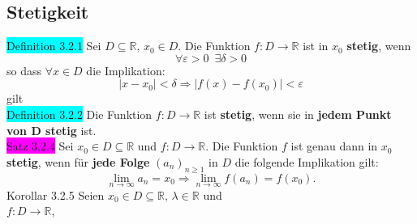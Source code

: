 \documentclass[landscape, 10pt]{article}
\newcommand{\R}{\mathbb{R}}
\begin{document}
\begin{multicols}{3}
       \subsection{Stetigkeit}
              \colorbox{cyan}{Definition 3.2.1} 
                     Sei $D\subseteq\R,\,x_0\in D$. 
                     Die Funktion \textcolor{NavyBlue}{$f:D\longrightarrow\R$} 
                     ist in $x_0$ \textbf{stetig}, 
                     wenn 
                     \begin{equation*}
                            \forall\varepsilon>0
                            \enspace\exists\delta>0
                     \end{equation*}
                     so dass 
                     \textcolor{NavyBlue}{$\forall x\in D$} 
                     die Implikation:
                     \begin{equation*}
                            |x-x_0|<\delta\Rightarrow|f(x)-f(x_0)|<\varepsilon
                     \end{equation*}
                     gilt\\
              \colorbox{cyan}{Definition 3.2.2} 
                     Die Funktion \textcolor{NavyBlue}{$f:D\longrightarrow\R$}
                     ist \textbf{stetig}, wenn sie in 
                     \textbf{jedem Punkt von D stetig} ist.\\
              \colorbox{magenta}{Satz 3.2.4} Sei 
                     \textcolor{NavyBlue}{$x_0\in D\subseteq\R$} und 
                     \textcolor{NavyBlue}{$f:D\longrightarrow\R$}. 
                     Die Funktion \textcolor{NavyBlue}{$f$} ist genau 
                     dann in \textcolor{NavyBlue}{$x_0$} 
                     \textbf{stetig}, wenn für 
                     \textbf{jede Folge} 
                     \textcolor{NavyBlue}{$(a_n)_{n\geqslant1}$} 
                     in $D$ die folgende Implikation gilt: 
                     \begin{equation*}
                            \lim\limits_{n\to\infty}a_n=x_0\Longrightarrow
                            \lim\limits_{n\to\infty}f(a_n)=f(x_0). 
                     \end{equation*}
              \colorbox{BurntOrange}{Korollar 3.2.5} Seien 
                     \textcolor{NavyBlue}{
                     $x_0\in D\subseteq\R,\,\lambda\in\R$} und \\
                     \textcolor{NavyBlue}{
                     $f:D\longrightarrow\R$},\,
                     \textcolor{NavyBlue}{
}
\end{multicols}
\end{document}
